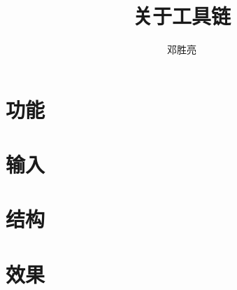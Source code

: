 \documentclass[UTF8]{ctexart}
\title{关于工具链}
\author{邓胜亮}
\begin{document}
  \maketitle
  \section{功能}
  \section{输入}
  \section{结构}
  \section{效果}
\end{document}
